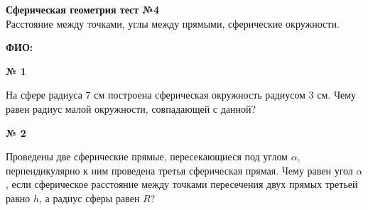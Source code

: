 


    \begin{center}
        \textbf{Сферическая геометрия тест №4}\\
        Расстояние между точками, углы между прямыми, сферические окружности.
    \end{center}

    \textbf{ФИО:}

    \begin{center}
        \textbf{№ 1}
    \end{center}

    На сфере радиуса 7 см построена сферическая окружность радиусом 3 см.
    Чему равен радиус малой окружности, совпадающей с данной?

    \begin{center}
        \textbf{№ 2}
    \end{center}

    Проведены две сферические прямые, пересекающиеся под углом $\alpha$,
    перпендикулярно к ним проведена третья сферическая прямая.
    Чему равен угол $\alpha$, если сферическое расстояние между точками пересечения
    двух прямых третьей равно $h$, а радиус сферы равен $R$?


